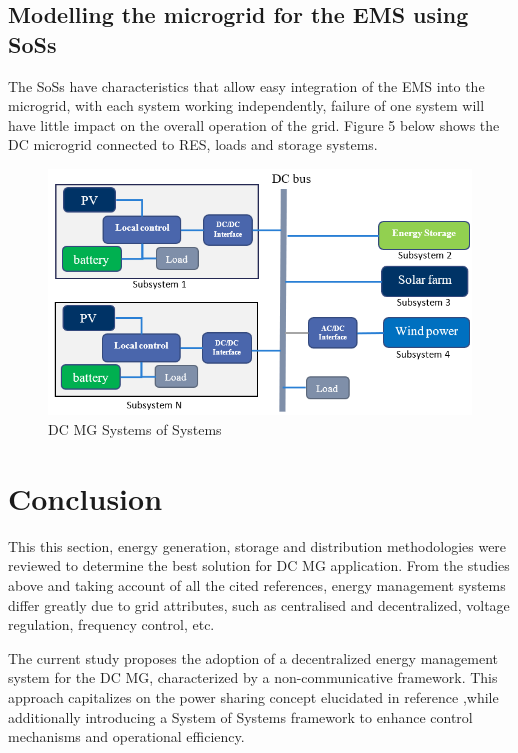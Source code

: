 \subsection{Modelling the microgrid for the EMS using SoSs}
The SoSs have characteristics that allow easy integration of the EMS into the microgrid, with each system working independently, failure of one system will have little impact on the overall operation of the grid. Figure 5 below shows the DC microgrid connected to RES, loads and storage systems.\par
\begin{figure}[H]
	\centering
	\includegraphics[totalheight=8cm]{Figures/dc mg systems of systems.png}
	\caption{DC MG Systems of Systems}
\end{figure}
\section{Conclusion}
This this section, energy generation, storage and distribution methodologies were reviewed to determine the best solution for DC MG application. From the studies above and taking account of all the cited references, energy management systems differ greatly due to grid attributes, such as centralised and decentralized, voltage regulation, frequency control, etc. \par
The current study proposes the adoption of a decentralized energy management system for the DC MG, characterized by a non-communicative framework. This approach capitalizes on the power sharing concept elucidated in reference  ,while additionally introducing a System of Systems framework to enhance control mechanisms and operational efficiency.\par

